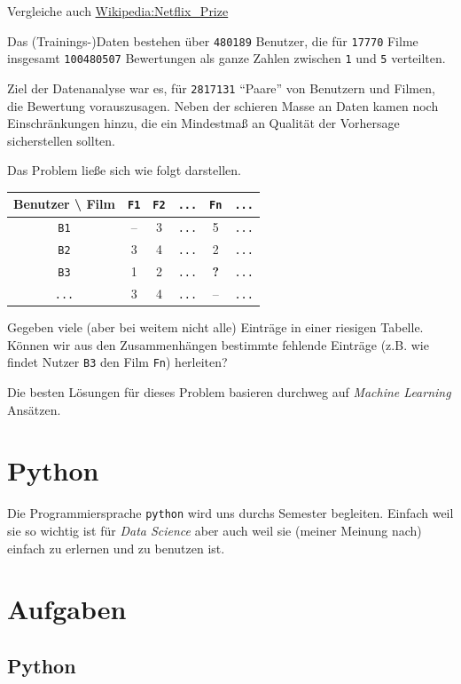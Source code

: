 \documentclass[]{book}
\theoremstyle{definition}
\theoremstyle{definition}
\theoremstyle{definition}
\theoremstyle{definition}
\theoremstyle{remark}
\begin{document}
Vergleiche auch \href{https://en.wikipedia.org/wiki/Netflix_Prize}{Wikipedia:Netflix\_Prize}

Das (Trainings-)Daten bestehen über \texttt{480189} Benutzer, die für \texttt{17770} Filme insgesamt \texttt{100480507} Bewertungen als ganze Zahlen zwischen \texttt{1} und \texttt{5} verteilten.

Ziel der Datenanalyse war es, für \texttt{2817131} ``Paare'' von Benutzern und Filmen, die Bewertung vorauszusagen. Neben der schieren Masse an Daten kamen noch Einschränkungen hinzu, die ein Mindestmaß an Qualität der Vorhersage sicherstellen sollten.

Das Problem ließe sich wie folgt darstellen.

\begin{longtable}[]{@{}cccccc@{}}
\toprule
Benutzer \textbackslash{} Film & \texttt{F1} & \texttt{F2} & \texttt{...} & \texttt{Fn} & \texttt{...}\tabularnewline
\midrule
\endhead
\texttt{B1} & -- & 3 & \texttt{...} & 5 & \texttt{...}\tabularnewline
\texttt{B2} & 3 & 4 & \texttt{...} & 2 & \texttt{...}\tabularnewline
\texttt{B3} & 1 & 2 & \texttt{...} & \textbf{?} & \texttt{...}\tabularnewline
\texttt{...} & 3 & 4 & \texttt{...} & -- & \texttt{...}\tabularnewline
\bottomrule
\end{longtable}

Gegeben viele (aber bei weitem nicht alle) Einträge in einer riesigen Tabelle. Können wir aus den Zusammenhängen bestimmte fehlende Einträge (z.B. wie findet Nutzer \texttt{B3} den Film \texttt{Fn}) herleiten?

Die besten Lösungen für dieses Problem basieren durchweg auf \emph{Machine Learning} Ansätzen.

\hypertarget{python}{%
\section{Python}\label{python}}

Die Programmiersprache \texttt{python} wird uns durchs Semester begleiten. Einfach weil sie so wichtig ist für \emph{Data Science} aber auch weil sie (meiner Meinung nach) einfach zu erlernen und zu benutzen ist.

\hypertarget{aufgaben}{%
\section{Aufgaben}\label{aufgaben}}

\hypertarget{python-1}{%
\subsection{Python}\label{python-1}}
\end{document}
